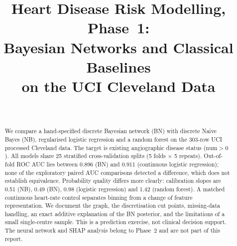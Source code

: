 \documentclass[conference]{IEEEtran}
\begin{document}
\title{Heart Disease Risk Modelling, Phase~1:\\Bayesian Networks and Classical Baselines\\on the UCI Cleveland Data}

\author{
\and
{}
\and
{}
\and
{}
\and
{}
\\[1ex]
}

\maketitle

\begin{abstract}
We compare a hand-specified discrete Bayesian network (BN) with discrete Naive Bayes (NB), regularised logistic regression and a random forest on the 303-row UCI processed Cleveland data. The target is existing angiographic disease status ($\mathrm{num}>0$). All models share 25 stratified cross-validation splits (5 folds $\times$ 5 repeats). Out-of-fold ROC AUC lies between 0.896 (BN) and 0.911 (continuous logistic regression); none of the exploratory paired AUC comparisons detected a difference, which does not establish equivalence. Probability quality differs more clearly: calibration slopes are 0.51 (NB), 0.49 (BN), 0.98 (logistic regression) and 1.42 (random forest). A matched continuous heart-rate control separates binning from a change of feature representation. We document the graph, the discretisation cut points, missing-data handling, an exact additive explanation of the BN posterior, and the limitations of a small single-centre sample. This is a prediction exercise, not clinical decision support. The neural network and SHAP analysis belong to Phase~2 and are not part of this report.
\end{abstract}
\end{document}

